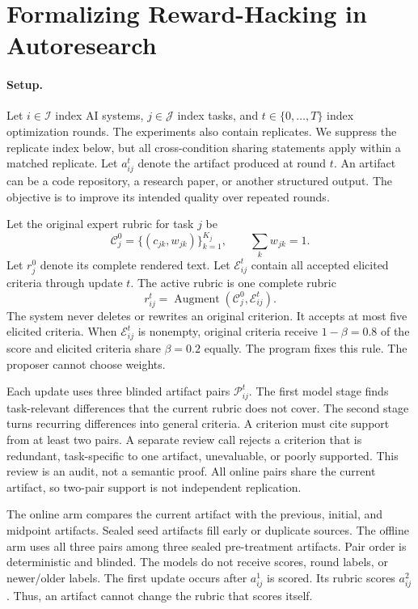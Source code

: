 \documentclass{article} %
\begin{document}
\section{Formalizing Reward-Hacking in Autoresearch}

\paragraph{Setup.}
Let $i \in \mathcal{I}$ index AI systems,
$j \in \mathcal{J}$ index tasks, and
$t \in \{0,\ldots,T\}$ index optimization rounds.
The experiments also contain replicates. We suppress the replicate index below,
but all cross-condition sharing statements apply within a matched replicate.
Let $a_{ij}^t$ denote the artifact produced at round $t$. An artifact can be a code repository, a research paper, or another structured output. The objective is to improve its intended quality over repeated rounds.

Let the original expert rubric for task $j$ be
\begin{equation}
\mathcal C_j^0=\{(c_{jk},w_{jk})\}_{k=1}^{K_j},
\qquad \sum_k w_{jk}=1.
\end{equation}
Let $r_j^0$ denote its complete rendered text.
Let $\mathcal E_{ij}^t$ contain all accepted elicited criteria through update
$t$. The active rubric is one complete rubric
\begin{equation}
r_{ij}^t=\operatorname{Augment}(\mathcal C_j^0,\mathcal E_{ij}^t).
\end{equation}
The system never deletes or rewrites an original criterion. It accepts at most
five elicited criteria. When $\mathcal E_{ij}^t$ is nonempty, original criteria
receive $1-\beta=0.8$ of the score and elicited criteria share $\beta=0.2$
equally. The program fixes this rule. The proposer cannot choose weights.

Each update uses three blinded artifact pairs $\mathcal P_{ij}^t$. The first
model stage finds task-relevant differences that the current rubric does not
cover. The second stage turns recurring differences into general criteria. A
criterion must cite support from at least two pairs. A separate review call rejects a
criterion that is redundant, task-specific to one artifact, unevaluable, or
poorly supported. This review is an audit, not a semantic proof.
All online pairs share the current artifact, so two-pair support is not
independent replication.

The online arm compares the current artifact with the previous, initial, and
midpoint artifacts. Sealed seed artifacts fill early or duplicate sources. The
offline arm uses all three pairs among three sealed pre-treatment artifacts.
Pair order is deterministic and blinded. The models do not receive scores,
round labels, or newer/older labels. The first update occurs after $a_{ij}^1$
is scored. Its rubric scores $a_{ij}^2$. Thus, an artifact cannot change the
rubric that scores itself.
\end{document}
